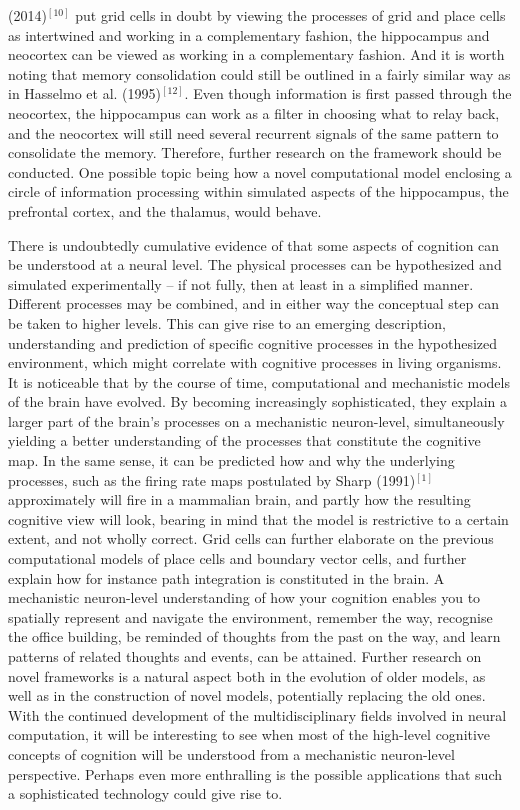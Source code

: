 (2014)$^{[10]}$ put grid cells in doubt by viewing the processes of grid and place cells as intertwined and working in a complementary fashion, the hippocampus and neocortex can be viewed as working in a complementary fashion. And it is worth noting that memory consolidation could still be outlined in a fairly similar way as in Hasselmo et al. (1995)$^{[12]}$. Even though information is first passed through the neocortex, the hippocampus can work as a filter in choosing what to relay back, and the neocortex will still need several recurrent signals of the same pattern to consolidate the memory. Therefore, further research on the framework should be conducted. One possible topic being how a novel computational model enclosing a circle of information processing within simulated aspects of the hippocampus, the prefrontal cortex, and the thalamus, would behave.

There is undoubtedly cumulative evidence of that some aspects of cognition can be understood at a neural level. The physical processes can be hypothesized and simulated experimentally – if not fully, then at least in a simplified manner. Different processes may be combined, and in either way the conceptual step can be taken to higher levels. This can give rise to an emerging description, understanding and prediction of specific cognitive processes in the hypothesized environment, which might correlate with cognitive processes in living organisms. It is noticeable that by the course of time, computational and mechanistic models of the brain have evolved. By becoming increasingly sophisticated, they explain a larger part of the brain’s processes on a mechanistic neuron-level, simultaneously yielding a better understanding of the processes that constitute the cognitive map. In the same sense, it can be predicted how and why the underlying processes, such as the firing rate maps postulated by Sharp (1991)$^{[1]}$ approximately will fire in a mammalian brain, and partly how the resulting cognitive view will look, bearing in mind that the model is restrictive to a certain extent, and not wholly correct. Grid cells can further elaborate on the previous computational models of place cells and boundary vector cells, and further explain how for instance path integration is constituted in the brain. A mechanistic neuron-level understanding of how your cognition enables you to spatially represent and navigate the environment, remember the way, recognise the office building, be reminded of thoughts from the past on the way, and learn patterns of related thoughts and events, can be attained. Further research on novel frameworks is a natural aspect both in the evolution of older models, as well as in the construction of novel models, potentially replacing the old ones. With the continued development of the multidisciplinary fields involved in neural computation, it will be interesting to see when most of the high-level cognitive concepts of cognition will be understood from a mechanistic neuron-level perspective.  Perhaps even more enthralling is the possible applications that such a sophisticated technology could give rise to.
\\

